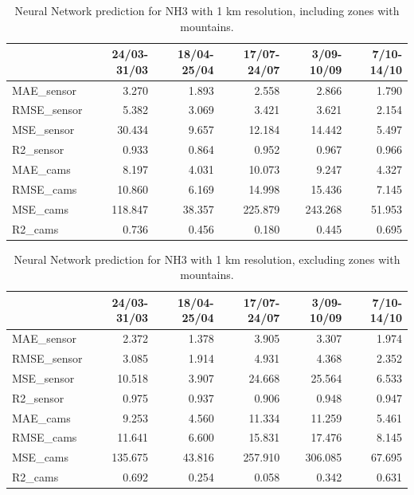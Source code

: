 \begin{table}[H]
\begin{tabular}{lrrrrr}
\toprule
  &  24/03-31/03 &  18/04-25/04 &  17/07-24/07 &  3/09-10/09 &  7/10-14/10 \\
\midrule
 MAE\_sensor &        3.270 &        1.893 &        2.558 &       2.866 &       1.790 \\
RMSE\_sensor &        5.382 &        3.069 &        3.421 &       3.621 &       2.154 \\
 MSE\_sensor &       30.434 &        9.657 &       12.184 &      14.442 &       5.497 \\
  R2\_sensor &        0.933 &        0.864 &        0.952 &       0.967 &       0.966 \\
   MAE\_cams &        8.197 &        4.031 &       10.073 &       9.247 &       4.327 \\
  RMSE\_cams &       10.860 &        6.169 &       14.998 &      15.436 &       7.145 \\
   MSE\_cams &      118.847 &       38.357 &      225.879 &     243.268 &      51.953 \\
    R2\_cams &        0.736 &        0.456 &        0.180 &       0.445 &       0.695 \\
\bottomrule
\end{tabular}
\caption{Neural Network prediction for NH3 with 1 km resolution, including zones with mountains.}
\end{table}


\begin{table}[H]
\begin{tabular}{lrrrrr}
\toprule
  &  24/03-31/03 &  18/04-25/04 &  17/07-24/07 &  3/09-10/09 &  7/10-14/10 \\
\midrule
 MAE\_sensor &        2.372 &        1.378 &        3.905 &       3.307 &       1.974 \\
RMSE\_sensor &        3.085 &        1.914 &        4.931 &       4.368 &       2.352 \\
 MSE\_sensor &       10.518 &        3.907 &       24.668 &      25.564 &       6.533 \\
  R2\_sensor &        0.975 &        0.937 &        0.906 &       0.948 &       0.947 \\
   MAE\_cams &        9.253 &        4.560 &       11.334 &      11.259 &       5.461 \\
  RMSE\_cams &       11.641 &        6.600 &       15.831 &      17.476 &       8.145 \\
   MSE\_cams &      135.675 &       43.816 &      257.910 &     306.085 &      67.695 \\
    R2\_cams &        0.692 &        0.254 &        0.058 &       0.342 &       0.631 \\
\bottomrule
\end{tabular}
\caption{Neural Network prediction for NH3 with 1 km resolution, excluding zones with mountains.}
\end{table}









